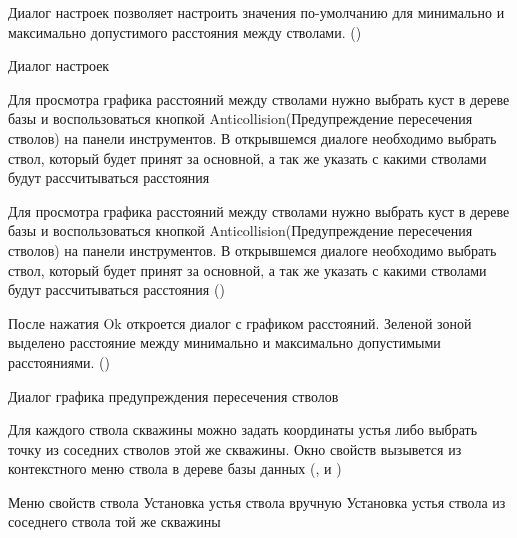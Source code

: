 Диалог настроек позволяет настроить значения по-умолчанию для минимально и максимально допустимого расстояния между стволами.
()

{Диалог настроек}

Для просмотра графика расстояний между стволами нужно выбрать куст в дереве базы и воспользоваться кнопкой Anticollision(Предупреждение пересечения стволов) на панели инструментов.
В открывшемся диалоге необходимо выбрать ствол, который будет принят за основной, а так же указать с какими стволами будут рассчитываться расстояния

Для просмотра графика расстояний между стволами нужно выбрать куст в дереве базы и воспользоваться кнопкой Anticollision(Предупреждение пересечения стволов) на панели инструментов.
В открывшемся диалоге необходимо выбрать ствол, который будет принят за основной, а так же указать с какими стволами будут рассчитываться расстояния
()


После нажатия Ok откроется диалог с графиком расстояний. Зеленой зоной выделено расстояние между минимально и максимально допустимыми расстояниями.
()

{Диалог графика предупреждения пересечения стволов}

Для каждого ствола скважины можно задать координаты устья либо выбрать точку из соседних стволов этой же скважины. Окно свойств вызывется из контекстного меню ствола в дереве базы данных
(,  и )

{Меню свойств ствола}
{Установка устья ствола вручную}
{Установка устья ствола из соседнего ствола той же скважины}
